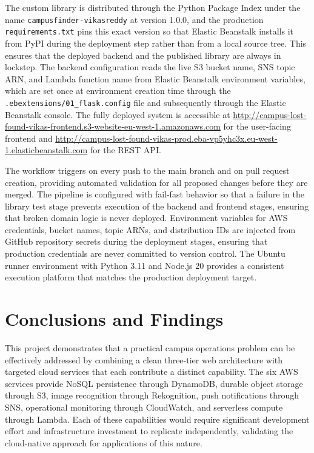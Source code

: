 \documentclass[conference]{IEEEtran}
\begin{document}
The custom library is distributed through the Python Package Index under the name \texttt{campusfinder-vikasreddy} at version 1.0.0, and the production \texttt{requirements.txt} pins this exact version so that Elastic Beanstalk installs it from PyPI during the deployment step rather than from a local source tree. This ensures that the deployed backend and the published library are always in lockstep. The backend configuration reads the live S3 bucket name, SNS topic ARN, and Lambda function name from Elastic Beanstalk environment variables, which are set once at environment creation time through the \texttt{.ebextensions/01\_flask.config} file and subsequently through the Elastic Beanstalk console. The fully deployed system is accessible at \url{http://campus-lost-found-vikas-frontend.s3-website-eu-west-1.amazonaws.com} for the user-facing frontend and \url{http://campus-lost-found-vikas-prod.eba-vp5yhc3x.eu-west-1.elasticbeanstalk.com} for the REST API.

The workflow triggers on every push to the main branch and on pull request creation, providing automated validation for all proposed changes before they are merged. The pipeline is configured with fail-fast behavior so that a failure in the library test stage prevents execution of the backend and frontend stages, ensuring that broken domain logic is never deployed. Environment variables for AWS credentials, bucket names, topic ARNs, and distribution IDs are injected from GitHub repository secrets during the deployment stages, ensuring that production credentials are never committed to version control. The Ubuntu runner environment with Python 3.11 and Node.js 20 provides a consistent execution platform that matches the production deployment target.

\section{Conclusions and Findings}

This project demonstrates that a practical campus operations problem can be effectively addressed by combining a clean three-tier web architecture with targeted cloud services that each contribute a distinct capability. The six AWS services provide NoSQL persistence through DynamoDB, durable object storage through S3, image recognition through Rekognition, push notifications through SNS, operational monitoring through CloudWatch, and serverless compute through Lambda. Each of these capabilities would require significant development effort and infrastructure investment to replicate independently, validating the cloud-native approach for applications of this nature.
\end{document}
